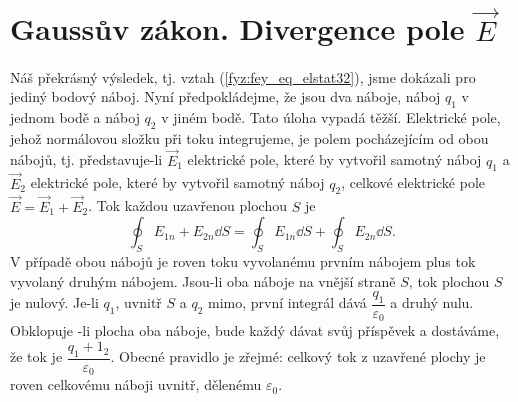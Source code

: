     \begin{figure}[ht!]
      \centering
      \hspace{0.1\textwidth}
      \caption{ }       
    \end{figure}

  \section{Gaussův zákon. Divergence pole \texorpdfstring{\(\vec{E}\)}{E}}    
    \cite[s.~75]{Feynman02} Náš překrásný výsledek, tj. vztah (\ref{fyz:fey_eq_elstat32}), jsme 
    dokázali pro jediný bodový náboj. Nyní předpokládejme, že jsou dva náboje, náboj \(q_1\) v 
    jednom bodě a náboj \(q_2\) v jiném bodě. Tato úloha vypadá těžší. Elektrické pole, jehož 
    normálovou složku při toku integrujeme, je polem pocházejícím od obou nábojů, tj. představuje-li 
    \(\vec{E}_1\) elektrické pole, které by vytvořil samotný náboj \(q_1\) a \(\vec{E}_2\) 
    elektrické pole, které by vytvořil samotný náboj \(q_2\), celkové elektrické pole 
    \(\vec{E}=\vec{E}_1 + \vec{E}_2\). Tok každou uzavřenou plochou \(S\) je
    \begin{equation}\label{fyz:fey_eq_elstat33}
     \oint_S E_{1n} + E_{2n}\dd{S} = \oint_S E_{1n}\dd{S} + \oint_S E_{2n}\dd{S}.
    \end{equation}
    V případě obou nábojů je roven toku vyvolanému prvním nábojem plus tok vyvolaný druhým nábojem. 
    Jsou-li oba náboje na vnější straně \(S\), tok plochou \(S\) je nulový. Je-li \(q_1\), uvnitř 
    \(S\) a \(q_2\) mimo, první integrál dává \(\dfrac{q_1}{\varepsilon_0}\) a druhý nulu. Obklopuje 
    -li plocha oba náboje, bude každý dávat svůj příspěvek a dostáváme, že tok je 
    \(\dfrac{q_1+1_2}{\varepsilon_0}\). Obecné pravidlo je zřejmé: celkový tok z uzavřené plochy je 
    roven celkovému náboji uvnitř, dělenému \(\varepsilon_0\).
    
